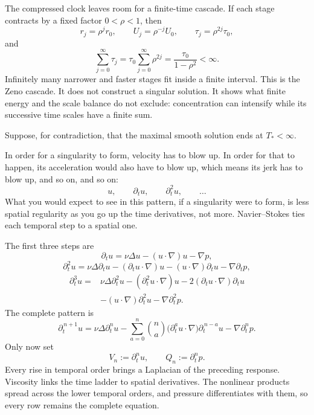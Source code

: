\documentclass[11pt]{article}
\begin{document}
The compressed clock leaves room for a finite-time cascade. If each stage contracts by a fixed factor \(0<\rho<1\), then
\[
r_j=\rho^jr_0,
\qquad
U_j=\rho^{-j}U_0,
\qquad
\tau_j=\rho^{2j}\tau_0,
\]
and
\[
\sum_{j=0}^{\infty}\tau_j
=\tau_0\sum_{j=0}^{\infty}\rho^{2j}
=\frac{\tau_0}{1-\rho^2}<\infty.
\]
Infinitely many narrower and faster stages fit inside a finite interval. This is the Zeno cascade. It does not construct a singular solution. It shows what finite energy and the scale balance do not exclude: concentration can intensify while its successive time scales have a finite sum.

Suppose, for contradiction, that the maximal smooth solution ends at \(T_*<\infty\).

In order for a singularity to form, velocity has to blow up. In order for that to happen, its acceleration would also have to blow up, which means its jerk has to blow up, and so on, and so on:
\[
u,\qquad \partial_tu,\qquad \partial_t^2u,\qquad \ldots
\]
What you would expect to see in this pattern, if a singularity were to form, is less spatial regularity as you go up the time derivatives, not more. Navier--Stokes ties each temporal step to a spatial one.

The first three steps are
\[
\partial_tu
=\nu\Delta u-(u\cdot\nabla)u-\nabla p,
\]
\[
\partial_t^2u
=\nu\Delta\partial_tu
-(\partial_tu\cdot\nabla)u
-(u\cdot\nabla)\partial_tu
-\nabla\partial_tp,
\]
\[
\begin{aligned}
\partial_t^3u={}&\nu\Delta\partial_t^2u
-(\partial_t^2u\cdot\nabla)u
-2(\partial_tu\cdot\nabla)\partial_tu \\
&-(u\cdot\nabla)\partial_t^2u
-\nabla\partial_t^2p.
\end{aligned}
\]
The complete pattern is
\[
\partial_t^{\,n+1}u
=\nu\Delta\partial_t^nu
-\sum_{a=0}^{n}\binom na
\bigl(\partial_t^au\cdot\nabla\bigr)\partial_t^{\,n-a}u
-\nabla\partial_t^np.
\]
Only now set
\[
V_n:=\partial_t^nu,
\qquad
Q_n:=\partial_t^np.
\]
Every rise in temporal order brings a Laplacian of the preceding response. Viscosity links the time ladder to spatial derivatives. The nonlinear products spread across the lower temporal orders, and pressure differentiates with them, so every row remains the complete equation.
\end{document}
